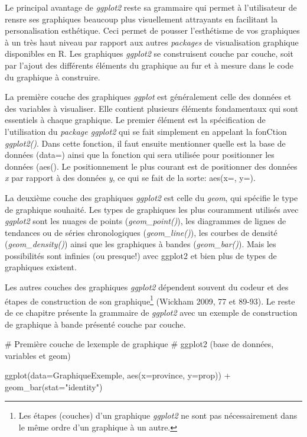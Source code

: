\documentclass[
  letterpaper,
]{scrbook}
\newenvironment{Shaded}{\begin{snugshade}}{\end{snugshade}}
\newcommand{\AttributeTok}[1]{\textcolor[rgb]{0.40,0.45,0.13}{#1}}
\newcommand{\CommentTok}[1]{\textcolor[rgb]{0.37,0.37,0.37}{#1}}
\newcommand{\FunctionTok}[1]{\textcolor[rgb]{0.28,0.35,0.67}{#1}}
\newcommand{\NormalTok}[1]{\textcolor[rgb]{0.00,0.23,0.31}{#1}}
\newcommand{\SpecialCharTok}[1]{\textcolor[rgb]{0.37,0.37,0.37}{#1}}
\newcommand{\StringTok}[1]{\textcolor[rgb]{0.13,0.47,0.30}{#1}}
\begin{document}
Le principal avantage de \emph{ggplot2} reste sa grammaire qui permet à
l'utilisateur de rensre ses graphiques beaucoup plus visuellement
attrayants en facilitant la personalisation esthétique. Ceci permet de
pousser l'esthétisme de vos graphiques à un très haut niveau par rapport
aux autres \emph{packages} de visualisation graphique disponibles en R.
Les graphiques \emph{ggplot2} se construisent couche par couche, soit
par l'ajout des différents éléments du graphique au fur et à mesure dans
le code du graphique à construire.

La première couche des graphiques \emph{ggplot} est généralement celle
des données et des variables à visualiser. Elle contient plusieurs
éléments fondamentaux qui sont essentiels à chaque graphique. Le premier
élément est la spécification de l'utilisation du \emph{package ggplot2}
qui se fait simplement en appelant la fonCtion \emph{ggplot2()}. Dans
cette fonction, il faut ensuite mentionner quelle est la base de données
(data=) ainsi que la fonction qui sera utilisée pour positionner les
données (aes(). Le positionnement le plus courant est de positionner des
données \emph{x} par rapport à des données \emph{y}, ce qui se fait de
la sorte: aes(x=, y=).

La deuxième couche des graphiques \emph{ggplot2} est celle du
\emph{geom}, qui spécifie le type de graphique souhaité. Les types de
graphiques les plus couramment utilisés avec \emph{ggplot2} sont les
nuages de points (\emph{geom\_point()}), les diagrammes de lignes de
tendances ou de séries chronologiques (\emph{geom\_line()}), les courbes
de densité (\emph{geom\_density()}) ainsi que les graphiques à bandes
(\emph{geom\_bar()}). Mais les possibilités sont infinies (ou presque!)
avec ggplot2 et bien plus de types de graphiques existent.

Les autres couches des graphiques \emph{ggplot2} dépendent souvent du
codeur et des étapes de construction de son graphique\footnote{Les
  étapes (couches) d'un graphique \emph{ggplot2} ne sont pas
  nécessairement dans le même ordre d'un graphique à un autre.} (Wickham
2009, 77 et 89-93). Le reste de ce chapitre présente la grammaire de
\emph{ggplot2} avec un exemple de construction de graphique à bande
présenté couche par couche.

\begin{Shaded}
\begin{Highlighting}[]
\CommentTok{\# Première couche de l\textquotesingle{}exemple de graphique}
\CommentTok{\# ggplot2 (base de données, variables et geom)}

\FunctionTok{ggplot}\NormalTok{(}\AttributeTok{data=}\NormalTok{GraphiqueExemple, }\FunctionTok{aes}\NormalTok{(}\AttributeTok{x=}\NormalTok{province, }\AttributeTok{y=}\NormalTok{prop)) }\SpecialCharTok{+}
  \FunctionTok{geom\_bar}\NormalTok{(}\AttributeTok{stat=}\StringTok{"identity"}\NormalTok{) }
\end{Highlighting}
\end{Shaded}
\end{document}

